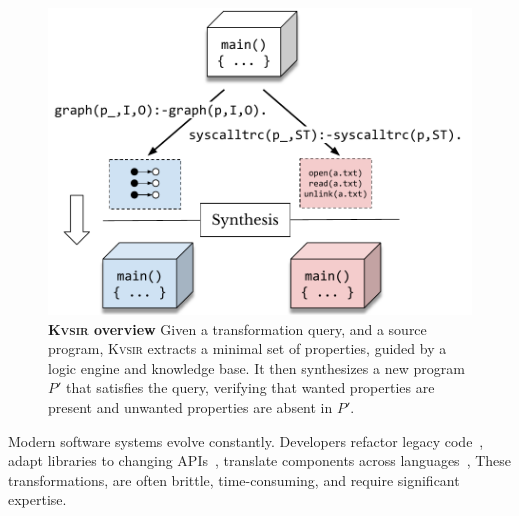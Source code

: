 \documentclass[sigplan,review,anonymous,10pt]{acmart}
\newcommand{\sys}{{\scshape Kv{\textalpha}sir}\xspace}
\begin{document}
\begin{figure}[t]
  \includegraphics[width=.9\columnwidth]{figs/kvasir_projection.pdf}
  \caption{\textbf{\sys overview}
Given a transformation query, and a source program, \sys extracts a minimal set
  of properties,
  guided by a logic engine and knowledge base.
  It then synthesizes a new program $P'$ that satisfies the query, verifying
  that wanted properties are present and unwanted properties are absent in $P'$.
}
  \label{fig:projection}
\end{figure}





Modern software systems evolve constantly.
Developers refactor legacy code~\cite{Fowler99,Mens04,facebook2010redesigns,dropbox2014syncengine},
adapt libraries to changing APIs~\cite{dig2005role,kula2017empiricalstudyimpactrefactoring},
translate components across languages~\cite{manzoor_cli_python,gaultier_rewrite_cpp},
These transformations, are often brittle, time-consuming, and require significant expertise.
\end{document}
